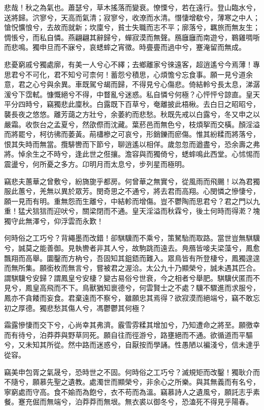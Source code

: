
\begin{pinyinscope}
悲哉！秋之為氣也。蕭瑟兮，草木搖落而變衰。憭慄兮，若在遠行。登山臨水兮，送將歸。泬寥兮，天高而氣清；寂寥兮，收潦而水清。憯悽增欷兮，薄寒之中人；愴怳懭悢兮，去故而就新；坎廩兮，貧士失職而志不平；廓落兮，羈旅而無友生；惆悵兮，而私自憐。燕翩翩其辭歸兮，蟬寂漠而無聲。鴈廱廱而南遊兮，鶤雞啁哳而悲鳴。獨申旦而不寐兮，哀蟋蟀之宵徵。時亹亹而過中兮，蹇淹留而無成。

悲憂窮戚兮獨處廓，有美一人兮心不繹；去鄉離家兮徠遠客，超逍遙兮今焉薄！專思君兮不可化，君不知兮可柰何！蓄怨兮積思，心煩憺兮忘食事。願一見兮道余意，君之心兮與余異。車既駕兮朅而歸，不得見兮心傷悲。倚結軨兮長太息，涕潺湲兮下霑軾。慷慨絕兮不得，中瞀亂兮迷惑。私自憐兮何極？心怦怦兮諒直。皇天平分四時兮，竊獨悲此廩秋。白露既下百草兮，奄離披此梧楸。去白日之昭昭兮，襲長夜之悠悠。離芳藹之方壯兮，余萎約而悲愁。秋既先戒以白露兮，冬又申之以嚴霜。收恢台之孟夏兮，然欿傺而沈藏。葉菸邑而無色兮，枝煩挐而交橫。顏淫溢而將罷兮，柯彷彿而萎黃。萷櫹槮之可哀兮，形銷鑠而瘀傷。惟其紛糅而將落兮，恨其失時而無當。攬騑轡而下節兮，聊逍遙以相佯。歲忽忽而遒盡兮，恐余壽之弗將。悼余生之不時兮，逢此世之俇攘。澹容與而獨倚兮，蟋蟀鳴此西堂。心怵惕而震盪兮，何所憂之多方。卬明月而太息兮，步列星而極明。

竊悲夫蕙華之曾敷兮，紛旖旎乎都房。何曾華之無實兮，從風雨而飛颺！以為君獨服此蕙兮，羌無以異於眾芳。閔奇思之不通兮，將去君而高翔。心閔憐之慘悽兮，願一見而有明。重無怨而生離兮，中結軫而增傷。豈不鬱陶而思君兮？君之門以九重！猛犬狺狺而迎吠兮，關梁閉而不通。皇天淫溢而秋霖兮，後土何時而得漧？塊獨守此無澤兮，仰浮雲而永歎！

何時俗之工巧兮？背繩墨而改錯！卻騏驥而不乘兮，策駑駘而取路。當世豈無騏驥兮，誠莫之能善御。見執轡者非其人兮，故駒跳而遠去。鳧鴈皆唼夫梁藻兮，鳳愈飄翔而高舉。圜鑿而方枘兮，吾固知其鉏鋙而難入。眾鳥皆有所登棲兮，鳳獨遑遑而無所集。願銜枚而無言兮，嘗被君之渥洽。太公九十乃顯榮兮，誠未遇其匹合。謂騏驥兮安歸？謂鳳皇兮安棲？變古易俗兮世衰，今之相者兮舉肥。騏驥伏匿而不見兮，鳳皇高飛而不下。鳥獸猶知褱德兮，何雲賢士之不處？驥不驟進而求服兮，鳳亦不貪餧而妄食。君棄遠而不察兮，雖願忠其焉得？欲寂漠而絕端兮，竊不敢忘初之厚德。獨悲愁其傷人兮，馮鬱鬱其何極？

霜露慘悽而交下兮，心尚幸其弗濟。霰雪雰糅其增加兮，乃知遭命之將至。願徼幸而有待兮，泊莽莽與野草同死。願自往而徑游兮，路壅絕而不通。欲循道而平驅兮，又未知其所從。然中路而迷惑兮，自厭按而學誦。性愚陋以褊淺兮，信未達乎從容。

竊美申包胥之氣晟兮，恐時世之不固。何時俗之工巧兮？滅規矩而改鑿！獨耿介而不隨兮，願慕先聖之遺教。處濁世而顯榮兮，非余心之所樂。與其無義而有名兮，寧窮處而守高。食不媮而為飽兮，衣不苟而為溫。竊慕詩人之遺風兮，願託志乎素餐。蹇充倔而無端兮，泊莽莽而無垠。無衣裘以御冬兮，恐溘死不得見乎陽春。


\end{pinyinscope}
